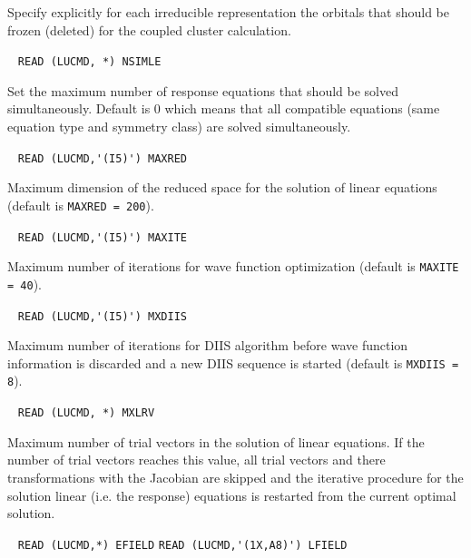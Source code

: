 \begin{description}
    Specify explicitly for each irreducible representation the
    orbitals that should be frozen (deleted) for the coupled cluster
    calculation.
 
\item[\Key{NSIMLE}] \verb| |\newline
  \verb|READ (LUCMD, *) NSIMLE|

  Set the maximum number of response equations that should be 
  solved simultaneously. Default is 0 which means that all
  compatible equations (same equation type and symmetry class) 
  are solved simultaneously.
 
\item[\Key{MAXRED}] \verb| |\newline 
  \verb|READ (LUCMD,'(I5)') MAXRED|

  Maximum dimension of the reduced space for the 
  solution of linear equations (default is \verb+MAXRED = 200+).
 
\item[\Key{MAXITE}] \verb| |\newline
  \verb|READ (LUCMD,'(I5)') MAXITE|

  Maximum number of iterations for wave function optimization 
  (default is \verb+MAXITE = 40+).
 
\item[\Key{MXDIIS}] \verb| |\newline
  \verb|READ (LUCMD,'(I5)') MXDIIS|

  Maximum number of iterations for DIIS algorithm
  before wave function information is discarded and a new DIIS 
  sequence is started
  (default is \verb+MXDIIS = 8+).
 
\item[\Key{MXLRV}] \verb| |\newline
  \verb|READ (LUCMD, *) MXLRV|

  Maximum number of trial vectors in the solution of 
  linear equations. If the number of trial vectors reaches this
  value, all trial vectors and there transformations with the
  Jacobian are skipped and the iterative procedure for the solution
  linear (i.e. the response) equations is restarted from the current 
  optimal solution. 
 
\item[\Key{FIELD }] \verb| |\newline
    \verb|READ (LUCMD,*) EFIELD|\newline
    \verb|READ (LUCMD,'(1X,A8)') LFIELD|


\end{description}
